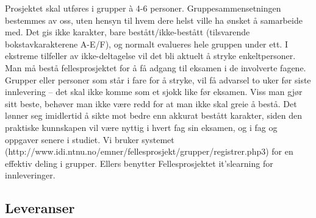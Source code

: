 Prosjektet skal utføres i grupper à 4-6 personer. Gruppesammensetningen bestemmes av oss, uten hensyn til hvem dere helst ville ha ønsket å samarbeide med. Det gis ikke karakter, bare bestått/ikke-bestått (tilsvarende bokstavkarakterene A-E/F), og normalt evalueres hele gruppen under ett. I ekstreme tilfeller av ikke-deltagelse vil det bli aktuelt å stryke enkeltpersoner. Man må bestå fellesprosjektet for å få adgang til eksamen i de involverte fagene. Grupper eller personer som står i fare for å stryke, vil få advarsel to uker før siste innlevering – det skal ikke komme som et sjokk like før eksamen. Viss man gjør sitt beste, behøver man ikke være redd for at man ikke skal greie å bestå. Det lønner seg imidlertid å sikte mot bedre enn akkurat bestått karakter, siden den praktiske kunnskapen vil være nyttig i hvert fag sin eksamen, og i fag og oppgaver senere i studiet.
Vi bruker systemet (http://www.idi.ntnu.no/emner/fellesprosjekt/grupper/registrer.php3) for en effektiv deling i grupper. Ellers benytter Fellesprosjektet it’slearning for innleveringer.

\newpage

\subsection{Leveranser}

